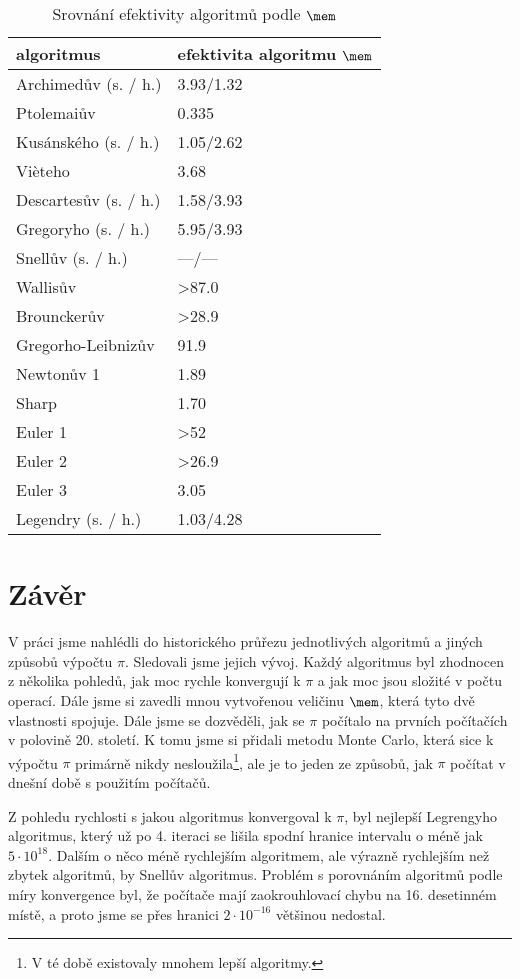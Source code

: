 \documentclass[soc]{gzwroc} %
\begin{document}
\begin{table}[h!]
\caption{Srovnání efektivity algoritmů podle $\mem$}
\begin{tabular}{|l||l|}
\hline
\bfseries{algoritmus} & efektivita algoritmu $\mem$ \\ \hline \hline
Archimedův (s. / h.) & 3.93/1.32  \\ \hline
Ptolemaiův &   0.335 \\ \hline
Kusánského (s. / h.) & 1.05/2.62 \\ \hline  
Vièteho & 3.68  \\ \hline
Descartesův (s. / h.) &  1.58/3.93    \\ \hline
Gregoryho (s. / h.) & 5.95/3.93   \\ \hline
Snellův (s. / h.) &  ---/---     \\ \hline
Wallisův &  >87.0  \\ \hline
Brounckerův &  >28.9  \\ \hline
Gregorho-Leibnizův & 91.9 \\ \hline
Newtonův 1 & 1.89 \\ \hline
Sharp & 1.70 \\ \hline
Euler 1 & >52  \\ \hline
Euler 2 & >26.9   \\ \hline
Euler 3 & 3.05  \\ \hline
Legendry (s. / h.) & 1.03/4.28 \\ \hline
\end{tabular}
\end{table}

\clearpage
\section{Závěr}
V práci jsme nahlédli do historického průřezu jednotlivých algoritmů a jiných způsobů výpočtu $\pi$. Sledovali jsme jejich vývoj. Každý algoritmus byl zhodnocen z několika pohledů, jak moc rychle konvergují k $\pi$ a jak moc jsou složité v počtu operací. Dále jsme si zavedli mnou vytvořenou veličinu $\mem$, která tyto dvě vlastnosti spojuje. Dále jsme se dozvěděli, jak se $\pi$ počítalo na prvních počítačích v polovině 20. století. K tomu jsme si přidali metodu Monte Carlo, která sice k výpočtu $\pi$ primárně nikdy nesloužila\footnote[13]{V té době existovaly mnohem lepší algoritmy.}, ale je to jeden ze způsobů, jak $\pi$ počítat v dnešní době s použitím počítačů.

Z pohledu rychlosti s jakou algoritmus konvergoval k $\pi$, byl nejlepší Legrengyho algoritmus, který už po 4. iteraci se lišila spodní hranice intervalu o méně jak $5\cdot10^18$. Dalším o něco méně rychlejším algoritmem, ale výrazně rychlejším než zbytek algoritmů, by Snellův algoritmus. Problém s porovnáním algoritmů podle míry konvergence byl, že počítače mají zaokrouhlovací chybu na 16. desetinném místě, a proto jsme se přes hranici $2\cdot10^{-16}$ většinou nedostal.
\end{document}
